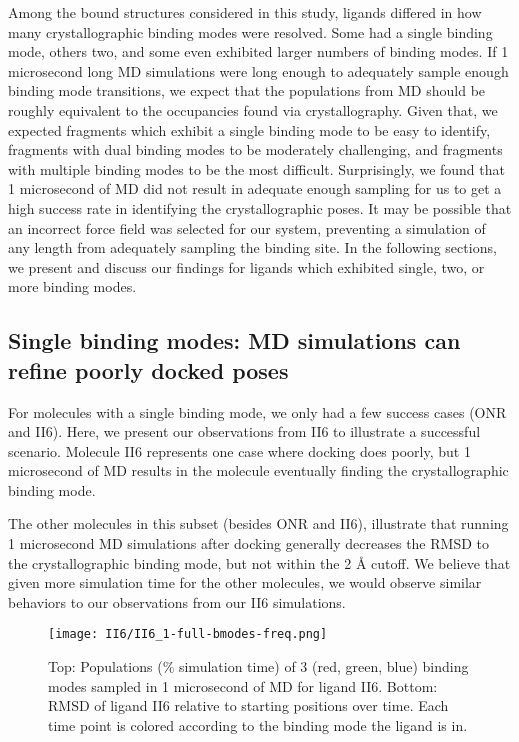\documentclass[journal=jcisd8,manuscript=article]{achemso}
\begin{document}
Among the bound structures considered in this study, ligands differed in how many crystallographic binding modes were resolved. 
Some had a single binding mode, others two, and some even exhibited larger numbers of binding modes.
If 1 microsecond long MD simulations were long enough to adequately sample enough binding mode transitions, we expect that the populations from MD should be roughly equivalent to the occupancies found via crystallography.
Given that, we expected fragments which exhibit a single binding mode to be easy to identify, fragments with dual binding modes to be moderately challenging, and fragments with multiple binding modes to be the most difficult.
Surprisingly, we found that 1 microsecond of MD did not result in adequate enough sampling for us to get a high success rate in identifying the crystallographic poses. 
It may be possible that an incorrect force field was selected for our system, preventing a simulation of any length from adequately sampling the binding site.
In the following sections, we present and discuss our findings for ligands which exhibited single, two, or more binding modes.

\subsection{Single binding modes: MD simulations can refine poorly docked poses}
For molecules with a single binding mode, we only had a few success cases (ONR and II6). 
Here, we present our observations from II6 to illustrate a successful scenario. 
Molecule II6 represents one case where docking does poorly, but 1 microsecond of MD results in the molecule eventually finding the crystallographic binding mode.

The other molecules in this subset (besides ONR and II6), illustrate that running 1 microsecond MD simulations after docking generally decreases the RMSD to the crystallographic binding mode, but not within the 2 {\AA} cutoff.
We believe that given more simulation time for the other molecules, we would observe similar behaviors to our observations from our II6 simulations.


\begin{figure}
    \centering
    \texttt{[image: II6/II6\_1-full-bmodes-freq.png]}
    \caption[Ligand II6 Binding Mode Populations]{Top: Populations (\% simulation time) of 3 (red, green, blue) binding modes sampled in 1 microsecond of MD for ligand II6. Bottom: RMSD of ligand II6 relative to starting positions over time. Each time point is colored according to the binding mode the ligand is in.}
    \label{fig:II6_bmodes}
\end{figure}
\end{document}
